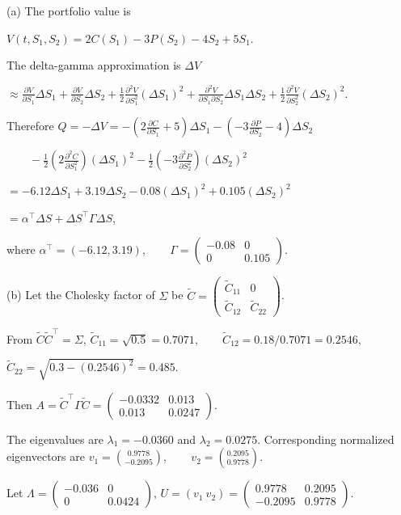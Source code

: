  (a) The portfolio value is

$V(t,S_1,S_2)=2C(S_1)-3P(S_2)-4S_2+5S_1$.

The delta-gamma approximation is $\Delta V$

$\approx\frac{\partial V}{\partial S_1}\Delta S_1+\frac{\partial V}{\partial S_2}\Delta S_2+\frac12\frac{\partial^2V}{\partial S_1^2}(\Delta S_1)^2+\frac{\partial^2V}{\partial S_1\partial S_2}\Delta S_1\Delta S_2+\frac12\frac{\partial^2V}{\partial S_2^2}(\Delta S_2)^2$.

Therefore
$Q=-\Delta V=-\left(2\frac{\partial C}{\partial S_1}+5\right)\Delta S_1-\left(-3\frac{\partial P}{\partial S_2}-4\right)\Delta S_2$

$\qquad-\frac12\left(2\frac{\partial^2C}{\partial S_1^2}\right)(\Delta S_1)^2-\frac12\left(-3\frac{\partial^2P}{\partial S_2^2}\right)(\Delta S_2)^2$

$=-6.12\Delta S_1+3.19\Delta S_2-0.08(\Delta S_1)^2+0.105(\Delta S_2)^2$

$=\alpha^\top\Delta S+\Delta S^\top\Gamma\Delta S$,

where
$\alpha^\top=(-6.12,3.19),\qquad \Gamma=\begin{pmatrix}-0.08&0\\0&0.105\end{pmatrix}$.

(b) Let the Cholesky factor of $\Sigma$ be
$\widetilde C=\begin{pmatrix}\widetilde C_{11}&0\\\widetilde C_{12}&\widetilde C_{22}\end{pmatrix}$.

From $\widetilde C\widetilde C^\top=\Sigma$,
$\widetilde C_{11}=\sqrt{0.5}=0.7071,\qquad \widetilde C_{12}=0.18/0.7071=0.2546,$

$\widetilde C_{22}=\sqrt{0.3-(0.2546)^2}=0.485$.

Then
$A=\widetilde C^\top\Gamma\widetilde C=\begin{pmatrix}-0.0332&0.013\\0.013&0.0247\end{pmatrix}$.

The eigenvalues are $\lambda_1=-0.0360$ and $\lambda_2=0.0275$. Corresponding normalized eigenvectors are
$v_1=\binom{0.9778}{-0.2095},\qquad v_2=\binom{0.2095}{0.9778}$.

Let
$\Lambda=\begin{pmatrix}-0.036&0\\0&0.0424\end{pmatrix},\, U=(v_1\ v_2)=\begin{pmatrix}0.9778&0.2095\\-0.2095&0.9778\end{pmatrix}$.

